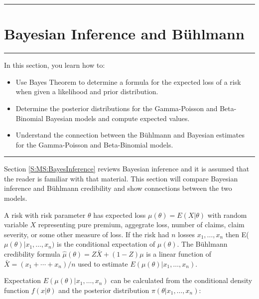\documentclass[]{book}
\providecommand{\tightlist}{%
  \setlength{\itemsep}{0pt}\setlength{\parskip}{0pt}}
\theoremstyle{definition}
\theoremstyle{definition}
\theoremstyle{definition}
\theoremstyle{remark}
\begin{document}
\begin{center}\rule{0.5\linewidth}{\linethickness}\end{center}

\section{Bayesian Inference and
Bühlmann}\label{bayesian-inference-and-buhlmann}

\begin{center}\rule{0.5\linewidth}{\linethickness}\end{center}

In this section, you learn how to:

\begin{itemize}
\tightlist
\item
  Use Bayes Theorem to determine a formula for the expected loss of a
  risk when given a likelihood and prior distribution.
\item
  Determine the posterior distributions for the Gamma-Poisson and
  Beta-Binomial Bayesian models and compute expected values.
\item
  Understand the connection between the Bühlmann and Bayesian estimates
  for the Gamma-Poisson and Beta-Binomial models.
\end{itemize}

\begin{center}\rule{0.5\linewidth}{\linethickness}\end{center}

Section \ref{S:MS:BayesInference} reviews Bayesian inference and it is
assumed that the reader is familiar with that material. This section
will compare Bayesian inference and Bühlmann credibility and show
connections between the two models.

A risk with risk parameter \(\theta\) has expected loss
\(\mu(\theta)=E(X|\theta)\) with random variable \(X\) representing pure
premium, aggegrate loss, number of claims, claim severity, or some other
measure of loss. If the risk had \(n\) losses \(x_1,\ldots, x_n\) then
E(\(\mu(\theta)|x_1,\ldots, x_n)\) is the conditional expectation of
\(\mu(\theta)\). The Bühlmann credibility formula
\(\hat{\mu}(\theta)=Z\bar{X}+(1-Z)\mu\) is a linear function of
\(\bar{X}=(x_1+\cdots+x_n)/n\) used to estimate
\(E(\mu(\theta)|x_1,\ldots,x_n)\).

Expectation \(E(\mu(\theta)|x_1,\ldots,x_n)\) can be calculated from the
conditional density function \(f(x|\theta)\) and the posterior
distribution \(\pi(\theta|x_1,\ldots,x_n)\):
\end{document}
